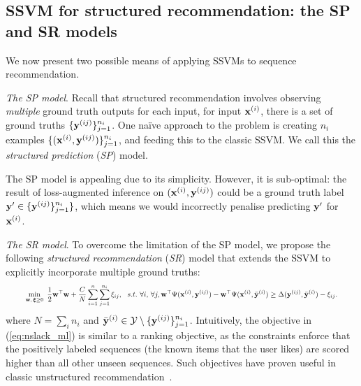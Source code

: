 \secmoveup
\subsection{SSVM for structured recommendation: the SP and SR models}
\label{ssec:sr}
\textmoveup

We now present two possible means of applying SSVMs to sequence recommendation.

\emph{The SP model}.
Recall that structured recommendation
involves observing \emph{multiple} ground truth outputs for each input, \ie
for input $\mathbf{x}^{({i})}$, there is a set of ground truths $\{\mathbf{y}^{({ij})}\}_{j=1}^{n_i}$.
One na\"{i}ve approach to the problem
is creating 
$n_i$ examples $\{(\mathbf{x}^{({i})}, \mathbf{y}^{({ij})})\}_{j=1}^{n_i}$,
and feeding this to the classic SSVM. %
We call this the \emph{structured prediction} (\emph{SP}) model.

The SP model is appealing due to its simplicity.
However, it is sub-optimal:
the result of loss-augmented inference on $(\mathbf{x}^{({i})}, \mathbf{y}^{({ij})})$ could be a ground truth label $\mathbf{y}' \in \{\mathbf{y}^{({ij})}\}_{j=1}^{n_i}\}$,
which means we would incorrectly penalise predicting $\mathbf{y}'$ for $\mathbf{x}^{({i})}$. 

\emph{The SR model}.
To overcome the limitation of the SP model,
we propose the following \emph{structured recommendation} (\emph{SR}) model that extends the SSVM to explicitly incorporate multiple ground truths: %
\begin{equation}
\label{eq:nslack_ml}
\resizebox{0.93\linewidth}{!}{$
\begin{aligned}
\min_{\w, \, \bm{\xi} \ge 0} ~ \frac{1}{2} \w^\top \w + \frac{C}{N} \sum_{i=1}^n \sum_{j=1}^{n_i} \xi_{ij}, ~~s.t.~ \forall i, \, \forall j, 
  \w^\top \Psi(\x^{(i)}, \y^{(ij)}) - \w^\top \Psi(\x^{(i)}, \bar{\y}^{(i)}) \ge
  \Delta(\y^{(ij)}, \bar{\y}^{(i)}) - \xi_{ij}.
\end{aligned}
$}
\end{equation}
where $N = \sum_i n_i$ and $\bar{\mathbf{y}}^{(i)} \in \mathcal{Y} \setminus \{\mathbf{y}^{(ij)}\}_{j=1}^{n_i}$.
Intuitively, the objective in (\ref{eq:nslack_ml}) is similar to a ranking objective, as the constraints enforce
that the positively labeled sequences (the known items that the user likes) are scored
higher than all other unseen sequences.
Such objectives have proven useful in classic unstructured recommendation~\cite{bpr09}.

